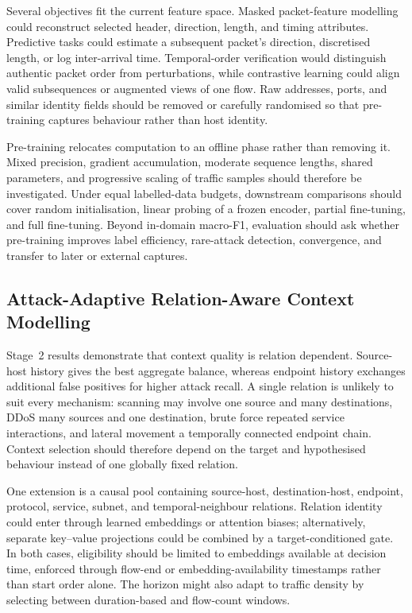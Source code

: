 \documentclass[11pt,fleqn]{report}
\begin{document}
Several objectives fit the current feature space. Masked packet-feature modelling could reconstruct selected header, direction, length, and timing attributes. Predictive tasks could estimate a subsequent packet's direction, discretised length, or log inter-arrival time. Temporal-order verification would distinguish authentic packet order from perturbations, while contrastive learning could align valid subsequences or augmented views of one flow. Raw addresses, ports, and similar identity fields should be removed or carefully randomised so that pre-training captures behaviour rather than host identity.

Pre-training relocates computation to an offline phase rather than removing it. Mixed precision, gradient accumulation, moderate sequence lengths, shared parameters, and progressive scaling of traffic samples should therefore be investigated. Under equal labelled-data budgets, downstream comparisons should cover random initialisation, linear probing of a frozen encoder, partial fine-tuning, and full fine-tuning. Beyond in-domain macro-F1, evaluation should ask whether pre-training improves label efficiency, rare-attack detection, convergence, and transfer to later or external captures.

\subsection{Attack-Adaptive Relation-Aware Context Modelling}
\label{subsubsec:future_relation_aware_context}

Stage~2 results demonstrate that context quality is relation dependent. Source-host history gives the best aggregate balance, whereas endpoint history exchanges additional false positives for higher attack recall. A single relation is unlikely to suit every mechanism: scanning may involve one source and many destinations, DDoS many sources and one destination, brute force repeated service interactions, and lateral movement a temporally connected endpoint chain. Context selection should therefore depend on the target and hypothesised behaviour instead of one globally fixed relation.

One extension is a causal pool containing source-host, destination-host, endpoint, protocol, service, subnet, and temporal-neighbour relations. Relation identity could enter through learned embeddings or attention biases; alternatively, separate key--value projections could be combined by a target-conditioned gate. In both cases, eligibility should be limited to embeddings available at decision time, enforced through flow-end or embedding-availability timestamps rather than start order alone. The horizon might also adapt to traffic density by selecting between duration-based and flow-count windows.
\end{document}
